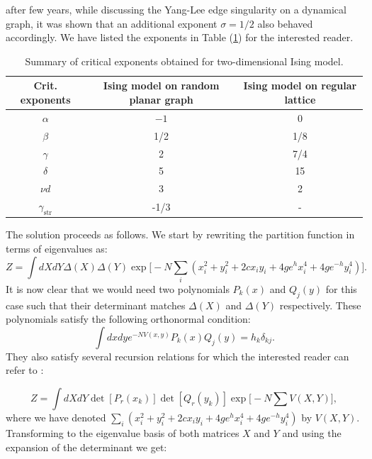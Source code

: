 \documentclass[letter,11pt]{article}
\begin{document}
after few years, while discussing the Yang-Lee edge singularity on a dynamical graph, it was shown that an additional exponent $\sigma =1/2$ 
also behaved accordingly. We have listed the exponents in Table (\ref{table:crit_exp}) for the interested reader.
\begin{table} 
	\begin{center} 
\begin{tabular}{|c|c|c|}
	\hline Crit. exponents & Ising model on random planar graph & Ising model on regular lattice \\
	\hline$\alpha$ & $-1$ & 0 \\
	$\beta$ & 1/2 & 1/8 \\
	$\gamma$ & 2 & 7/4 \\
	$\delta$ & 5 & 15 \\
	$\nu d$ & 3 & 2 \\
	$\gamma_{\text {str}}$ & -1/3 & - \\
	\hline
\end{tabular}
\end{center} 
	\caption{Summary of critical exponents obtained for two-dimensional Ising model.} 
	\label{table:crit_exp}
	\end{table} 
The solution proceeds as follows. We start by rewriting 
the partition function in terms of eigenvalues as:
\begin{equation}
	Z = \int dX dY \Delta(X) \Delta(Y)
	 \exp \Big[-N \sum_{i} (x_{i}^2 + y_{i}^{2} +2c x_{i}y_{i} + 4ge^{h}x_{i}^{4} + 4ge^{-h}y_{i}^4) \Big].
	\end{equation}
It is now clear that we would need two polynomials $P_{k}(x)$ and $Q_{j}(y)$ for this case 
such that their determinant matches $\Delta(X)$ and $\Delta(Y)$ respectively. 
These polynomials satisfy the following orthonormal condition: 
\begin{equation}
\int dx dy e^{-N V(x,y)} P_{k}(x) Q_{j}(y) = h_{k} \delta_{kj}. 
\end{equation}
They also satisfy several recursion relations for which the interested reader can refer to 
\cite{Boulatov:1986sb}:

\begin{equation}
	Z = \int dX dY \det[P_{r}(x_k)] \det[Q_{r}(y_k)] \exp\Big[-N \sum V(X,Y)\Big], 
\end{equation}
where we have denoted $\sum_{i} (x_{i}^2 + y_{i}^{2} +2c x_{i}y_{i} + 4ge^{h}x_{i}^{4} + 4ge^{-h}y_{i}^4)$ by $V(X,Y)$. 
Transforming to the eigenvalue basis of both matrices $X$ and $Y$ and using the expansion of the determinant we get:
\end{document}
